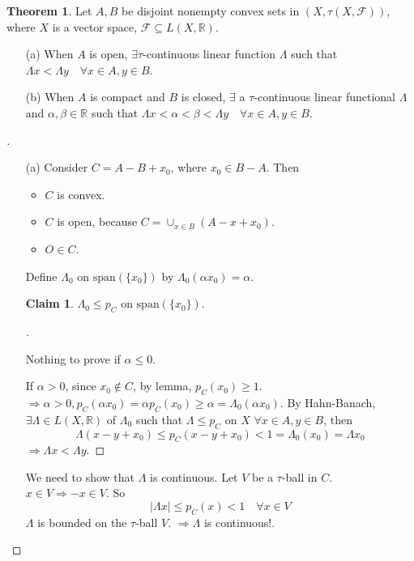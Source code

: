 \documentclass{article}
\theoremstyle{definition}
\newtheorem{thm}{Theorem}
\newtheorem*{clm}{Claim}
\newenvironment{proofs}[1][\proofname]{%
  \begin{proof}[#1]$ $\par\nobreak\ignorespaces
}{%
  \end{proof}
}
\newcommand{\F}{\mathcal F}
\newcommand{\RR}{\mathbb R}
\newcommand{\Ra}{\Rightarrow}
\begin{document}
\begin{thm}
	Let $A, B$ be disjoint nonempty convex sets in $(X, \tau(X, \F))$, where $X$ is a vector space, $\F \subseteq L(X, \RR)$.
	\begin{enumerate}
		\item[(a)] When $A$ is open, $\exists \tau$-continuous linear function $\Lambda$ such that $\Lambda x < \Lambda y \quad \forall x \in A, y \in B$.
			
		\item[(b)] When $A$ is compact and $B$ is closed, $\exists$ a $\tau$-continuous linear functional $\Lambda$ and $\alpha, \beta \in \RR$ such that $\Lambda x < \alpha < \beta < \Lambda y \quad \forall x \in A, y \in B$.
	\end{enumerate}
\end{thm}

\begin{proofs}
	\begin{enumerate}
		\item[(a)] Consider $C = A - B + x_0$, where $x_0 \in B - A$.
			Then 
			\begin{itemize}
				\item $C$ is convex.

				\item $C$ is open, because $C = \cup_{x \in B} (A - x + x_0)$.

				\item $O \in C$.
			\end{itemize}
			Define $\Lambda_0$ on $\text{span}(\{x_0\})$ by $\Lambda_0 (\alpha x_0) = \alpha$.
			\begin{clm}
				$\Lambda_0 \leq p_C$ on $\text{span}(\{x_0\})$.
			\end{clm}
			
			\begin{proofs}
				Nothing to prove if $\alpha \leq 0$.
				\par If $\alpha > 0$, since $x_0 \notin C$, by lemma, $p_C(x_0) \geq 1$.
				$\Ra \alpha > 0, p_C(\alpha x_0) = \alpha p_C(x_0) \geq \alpha = \Lambda_0(\alpha x_0)$.
				By Hahn-Banach, $\exists \Lambda \in L(X, \RR)$ of $\Lambda_0$ such that $\Lambda \leq p_C$ on $X$ $\forall x \in A, y \in B$, then
				\[
					\Lambda(x - y + x_0) \leq p_C(x - y + x_0) < 1 = \Lambda_0 (x_0) = \Lambda x_0
				\]
				$\Ra \Lambda x < \Lambda y$.
			\end{proofs}
			We need to show that $\Lambda$ is continuous.
			Let $V$ be a $\tau$-ball in $C$.
			$x \in V \Ra -x \in V$.
			So 
			\[
				|\Lambda x| \leq p_C(x) < 1 \quad \forall x \in V
			\]
			$\Lambda$ is bounded on the $\tau$-ball $V$.
			$\Ra \Lambda$ is continuous!.

	\end{enumerate}
\end{proofs}
\end{document}
